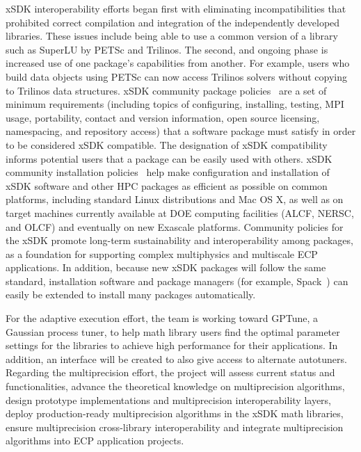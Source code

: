 xSDK interoperability efforts began first with eliminating incompatibilities that prohibited correct compilation and integration of the independently developed libraries.  These issues include being able to use a common version of a library such as SuperLU by PETSc and Trilinos.  The second, and ongoing phase is increased use of one package's capabilities from another.  For example, users who build data objects using PETSc can now access Trilinos solvers without copying to Trilinos data structures. xSDK community package policies~\cite{xsdk-policies:homepage,xSDK-community-package-policies2019} are a set of minimum requirements (including topics of configuring, installing, testing, MPI usage, portability, contact and version information, open source licensing, namespacing, and repository access) that a software package must satisfy in order to be considered xSDK compatible. The designation of xSDK compatibility informs potential users that a package can be easily used with others. 
xSDK community installation policies~\cite{xSDK-community-installation-policies2019} help make configuration and installation of xSDK software and other HPC packages as efficient as possible on common platforms, including standard Linux distributions and Mac OS X, as well as on target machines currently available at DOE computing facilities (ALCF, NERSC, and OLCF) and eventually on new Exascale platforms.
Community policies for the xSDK promote long-term sustainability and interoperability among packages, as a foundation for supporting complex multiphysics and multiscale ECP applications. In addition, because new xSDK packages will follow the same standard, installation software and package managers (for example, Spack~\cite{gamblin+:sc15}) can easily be extended to install many packages automatically.

For the adaptive execution effort, the team is working toward GPTune, a Gaussian process tuner, to help math library users find the optimal parameter settings for the libraries to achieve high performance for their applications. In addition, an interface will be created to also give access to alternate autotuners.
Regarding the multiprecision effort, the project will assess current status and functionalities, advance the theoretical knowledge on multiprecision algorithms, design prototype implementations and multiprecision interoperability layers, deploy production-ready multiprecision algorithms in the xSDK math libraries, ensure multiprecision cross-library interoperability and integrate multiprecision algorithms into ECP application projects.

